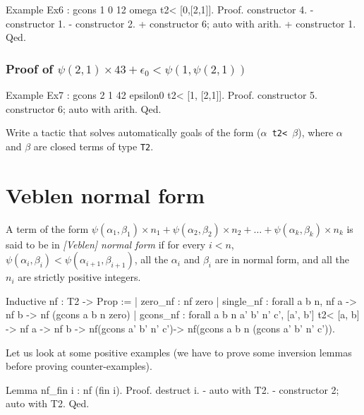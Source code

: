 {\begin{Coqsrc}
Example Ex6 : gcons 1 0 12 omega t2< [0,[2,1]].
Proof.
  constructor 4.
  - constructor 1.
  - constructor 2.
    + constructor 6; auto with arith.
    + constructor 1.
Qed.
\end{Coqsrc}

\subsubsection*{Proof of $\psi(2,1)\times 43 + \epsilon_0 < \psi(1,\psi(2,1))$}

\begin{Coqsrc}
Example Ex7 : gcons 2 1 42 epsilon0 t2< [1, [2,1]].
Proof.
 constructor 5.
 constructor 6; auto with arith.
Qed.
\end{Coqsrc}

\begin{project}
Write a tactic that solves automatically goals of the form (\texttt{$\alpha$ t2< $\beta$}), where $\alpha$ and $\beta$ are closed terms of type \texttt{T2}.
\end{project}

\section{Veblen normal form}
\begin{definition}
  A term of the form $\psi(\alpha_1,\beta_1)\times n_1+ \psi(\alpha_2,\beta_2)\times n_2+\dots+\psi(\alpha_k,\beta_k)\times n_k$ is said to be in
 \emph{[Veblen] normal form} if for every $i<n$, $\psi(\alpha_i,\beta_i)<\psi(\alpha_{i+1},\beta_{i+1})$, all the $\alpha_i$ and $\beta_i$ are in normal form, and all the $n_i$ are strictly positive integers.
\end{definition}

\begin{Coqsrc}
Inductive nf : T2 -> Prop :=
| zero_nf : nf zero
| single_nf : forall a b n, nf a ->  nf b -> nf (gcons a b n zero)
| gcons_nf : forall a b n a' b' n' c', 
                      [a', b'] t2< [a, b]  -> 
                      nf a -> nf b -> 
                      nf(gcons a' b' n' c')-> 
                      nf(gcons a b n (gcons a' b' n' c')).
\end{Coqsrc}

Let us look at some positive examples (we have to prove some inversion lemmas before proving counter-examples).


\begin{Coqsrc}
Lemma  nf_fin i : nf (fin i).
Proof.
  destruct i.
  - auto with T2.
  - constructor 2; auto with T2.
Qed.


\end{Coqsrc}}
